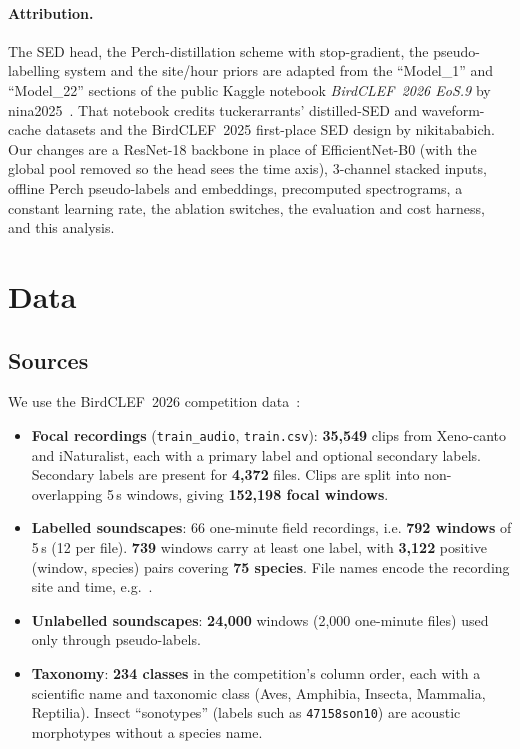 \documentclass[11pt]{article}
\begin{document}
\paragraph{Attribution.}
The SED head, the Perch-distillation scheme with stop-gradient, the
pseudo-labelling system and the site/hour priors are adapted from the
``Model\_1'' and ``Model\_22'' sections of the public Kaggle notebook
\emph{BirdCLEF~2026 EoS.9} by nina2025~\cite{nina2025}. That notebook credits
tuckerarrants' distilled-SED and waveform-cache datasets and the BirdCLEF~2025
first-place SED design by nikitababich. Our changes are a ResNet-18 backbone
in place of EfficientNet-B0 (with the global pool removed so the head sees the
time axis), 3-channel stacked inputs, offline Perch pseudo-labels and
embeddings, precomputed spectrograms, a constant learning rate, the ablation
switches, the evaluation and cost harness, and this analysis.

\section{Data}
\label{sec:data}

\subsection{Sources}
We use the BirdCLEF~2026 competition data~\cite{birdclef}:
\begin{itemize}
  \item \textbf{Focal recordings} (\texttt{train\_audio}, \texttt{train.csv}):
        \textbf{35{,}549} clips from Xeno-canto and iNaturalist, each with a
        primary label and optional secondary labels. Secondary labels are
        present for \textbf{4{,}372} files. Clips are split into
        non-overlapping 5\,s windows, giving \textbf{152{,}198 focal windows}.
  \item \textbf{Labelled soundscapes}: 66 one-minute field recordings, i.e.
        \textbf{792 windows} of 5\,s (12 per file). \textbf{739} windows carry
        at least one label, with \textbf{3{,}122} positive (window, species)
        pairs covering \textbf{75 species}. File names encode the recording
        site and time, e.g.\ .
  \item \textbf{Unlabelled soundscapes}: \textbf{24{,}000} windows (2{,}000
        one-minute files) used only through pseudo-labels.
  \item \textbf{Taxonomy}: \textbf{234 classes} in the competition's column
        order, each with a scientific name and taxonomic class (Aves,
        Amphibia, Insecta, Mammalia, Reptilia). Insect ``sonotypes'' (labels
        such as \texttt{47158son10}) are acoustic morphotypes without a
        species name.
\end{itemize}
\end{document}
